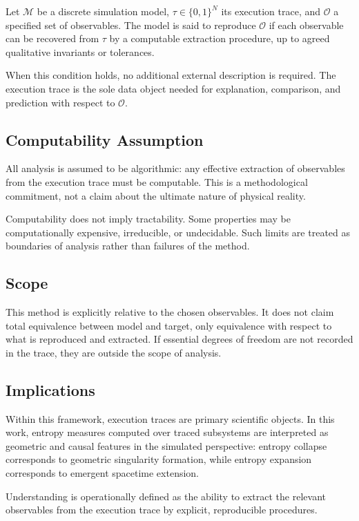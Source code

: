 \documentclass[11pt]{article}
\begin{document}
Let $\mathcal{M}$ be a discrete simulation model, $\tau \in \{0,1\}^N$ its execution trace, and $\mathcal{O}$ a specified set of observables. The model is said to reproduce $\mathcal{O}$ if each observable can be recovered from $\tau$ by a computable extraction procedure, up to agreed qualitative invariants or tolerances.

When this condition holds, no additional external description is required. The execution trace is the sole data object needed for explanation, comparison, and prediction with respect to $\mathcal{O}$.

\subsection*{Computability Assumption}

All analysis is assumed to be algorithmic: any effective extraction of observables from the execution trace must be computable. This is a methodological commitment, not a claim about the ultimate nature of physical reality.

Computability does not imply tractability. Some properties may be computationally expensive, irreducible, or undecidable. Such limits are treated as boundaries of analysis rather than failures of the method.

\subsection*{Scope}

This method is explicitly relative to the chosen observables. It does not claim total equivalence between model and target, only equivalence with respect to what is reproduced and extracted. If essential degrees of freedom are not recorded in the trace, they are outside the scope of analysis.

\subsection*{Implications}

Within this framework, execution traces are primary scientific objects. In this work, entropy measures computed over traced subsystems are interpreted as geometric and causal features in the simulated perspective: entropy collapse corresponds to geometric singularity formation, while entropy expansion corresponds to emergent spacetime extension.

Understanding is operationally defined as the ability to extract the relevant observables from the execution trace by explicit, reproducible procedures.


\printbibliography
\end{document}
